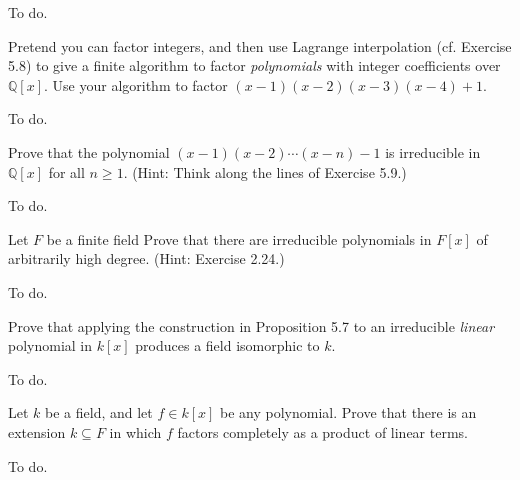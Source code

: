\documentclass[../../master.tex]{subfiles}
\begin{document}
\begin{solution}
    To do.
\end{solution}

\begin{problem}
    Pretend you can factor integers, and then use Lagrange interpolation (cf. Exercise 5.8) to give a finite algorithm to factor \textit{polynomials} with integer coefficients over $\mathbb{Q}[x]$.
    Use your algorithm to factor $(x-1)(x-2)(x-3)(x-4)+1$.
\end{problem}

\begin{solution}
    To do.
\end{solution}

\begin{problem}
    Prove that the polynomial $(x-1)(x-2)\cdots(x-n) - 1$ is irreducible in $\mathbb{Q}[x]$ for all $n \geq 1$. 
    (Hint: Think along the lines of Exercise 5.9.)
\end{problem}

\begin{solution}
    To do.
\end{solution}

\begin{problem}
    Let $F$ be a finite field
    Prove that there are irreducible polynomials in $F[x]$ of arbitrarily high degree.
    (Hint: Exercise 2.24.)
\end{problem}

\begin{solution}
    To do.
\end{solution}

\begin{problem}
    Prove that applying the construction in Proposition 5.7 to an irreducible \textit{linear} polynomial in $k[x]$ produces a field isomorphic to $k$.
\end{problem}

\begin{solution}
    To do.
\end{solution}

\begin{problem}
    Let $k$ be a field, and let $f \in k[x]$ be any polynomial.
    Prove that there is an extension $k \subseteq F$ in which $f$ factors completely as a product of linear terms.
\end{problem}

\begin{solution}
    To do.
\end{solution}
\end{document}
